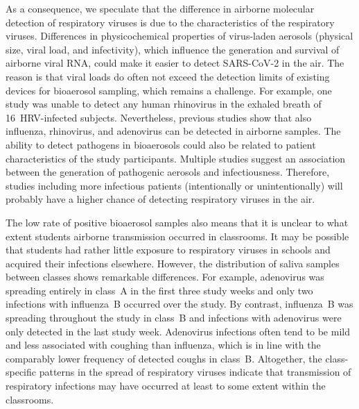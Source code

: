 \documentclass[fleqn,11pt]{wlscirep}
\begin{document}
As a consequence, we speculate that the difference in airborne molecular detection of respiratory viruses is due to the characteristics of the respiratory viruses. Differences in physicochemical properties of virus-laden aerosols (\eg physical size, viral load, and infectivity), which influence the generation and survival of airborne viral RNA\cite{Wang2021,Sattar2016Book}, could make it easier to detect SARS-CoV-2 in the air. The reason is that viral loads do often not exceed the detection limits of existing devices for bioaerosol sampling, which remains a challenge\cite{Wang2021,Belser2023PLOSPath,Bekking2019IORV,Mainelis2020AST}. For example, one study was unable to detect any human rhinovirus in the exhaled breath of 16~HRV-infected subjects\cite{Fabian2011JAMPDD}. Nevertheless, previous studies show that also influenza\cite{Bischoff2013JID,Pan2017mSphere}, rhinovirus\cite{Myatt2004AJRCCM}, and adenovirus\cite{Nguyen2017OFID,Pan2017mSphere} can be detected in airborne samples. The ability to detect pathogens in bioaerosols could also be related to patient characteristics of the study participants. Multiple studies suggest an association between the generation of pathogenic aerosols and infectiousness\cite{Leung2020NatMed,Bischoff2013JID,Escombe2008PLoSMed}. Therefore, studies including more infectious patients (intentionally or unintentionally) will probably have a higher chance of detecting respiratory viruses in the air. 


The low rate of positive bioaerosol samples also means that it is unclear to what extent students airborne transmission occurred in classrooms. It may be possible that students had rather little exposure to respiratory viruses in schools and acquired their infections elsewhere. However, the distribution of saliva samples between classes shows remarkable differences. For example, adenovirus was spreading entirely in class~A in the first three study weeks and only two infections with influenza~B occurred over the study. By contrast, influenza~B was spreading throughout the study in class~B and infections with adenovirus were only detected in the last study week. Adenovirus infections often tend to be mild\cite{Kunz2010CIDR} and less associated with coughing than influenza\cite{Ma2018RMV}, which is in line with the comparably lower frequency of detected coughs in class~B. Altogether, the class-specific patterns in the spread of respiratory viruses indicate that transmission of respiratory infections may have occurred at least to some extent within the classrooms. 
\end{document}
